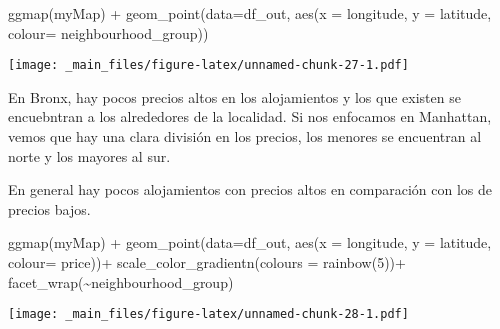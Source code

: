 \documentclass[
]{book}
\newenvironment{Shaded}{\begin{snugshade}}{\end{snugshade}}
\newcommand{\AttributeTok}[1]{\textcolor[rgb]{0.77,0.63,0.00}{#1}}
\newcommand{\DecValTok}[1]{\textcolor[rgb]{0.00,0.00,0.81}{#1}}
\newcommand{\FunctionTok}[1]{\textcolor[rgb]{0.00,0.00,0.00}{#1}}
\newcommand{\NormalTok}[1]{#1}
\newcommand{\SpecialCharTok}[1]{\textcolor[rgb]{0.00,0.00,0.00}{#1}}
\begin{document}
\begin{Shaded}
\begin{Highlighting}[]
\FunctionTok{ggmap}\NormalTok{(myMap) }\SpecialCharTok{+} \FunctionTok{geom\_point}\NormalTok{(}\AttributeTok{data=}\NormalTok{df\_out, }\FunctionTok{aes}\NormalTok{(}\AttributeTok{x =}\NormalTok{ longitude, }\AttributeTok{y =}\NormalTok{ latitude, }\AttributeTok{colour=}\NormalTok{ neighbourhood\_group))}
\end{Highlighting}
\end{Shaded}

\texttt{[image: \_main\_files/figure-latex/unnamed-chunk-27-1.pdf]}

En Bronx, hay pocos precios altos en los alojamientos y los que existen se encuebntran a los alrededores de la localidad. Si nos enfocamos en Manhattan, vemos que hay una clara división en los precios, los menores se encuentran al norte y los mayores al sur.

En general hay pocos alojamientos con precios altos en comparación con los de precios bajos.

\begin{Shaded}
\begin{Highlighting}[]
\FunctionTok{ggmap}\NormalTok{(myMap) }\SpecialCharTok{+} 
  \FunctionTok{geom\_point}\NormalTok{(}\AttributeTok{data=}\NormalTok{df\_out, }\FunctionTok{aes}\NormalTok{(}\AttributeTok{x =}\NormalTok{ longitude, }\AttributeTok{y =}\NormalTok{ latitude, }\AttributeTok{colour=}\NormalTok{ price))}\SpecialCharTok{+}
  \FunctionTok{scale\_color\_gradientn}\NormalTok{(}\AttributeTok{colours =} \FunctionTok{rainbow}\NormalTok{(}\DecValTok{5}\NormalTok{))}\SpecialCharTok{+}
  \FunctionTok{facet\_wrap}\NormalTok{(}\SpecialCharTok{\textasciitilde{}}\NormalTok{neighbourhood\_group)}
\end{Highlighting}
\end{Shaded}

\texttt{[image: \_main\_files/figure-latex/unnamed-chunk-28-1.pdf]}

  
\end{document}
